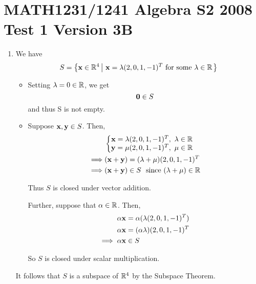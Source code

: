 \section*{MATH1231/1241 Algebra S2 2008 Test 1 Version 3B}
\begin{enumerate}
    \item We have
        $$S = \left\{ \mathbf{x} \in \mathbb{R}^4 \left|~ \mathbf{x} = \lambda (2, 0, 1, -1)^T
        \textrm{ for some } \lambda \in \mathbb{R} \right. \right\}$$

        \begin{itemize}
            \item
                Setting $\lambda = 0 \in \mathbb{R}$, we get
                $$\mathbf{0} \in S$$
                and thus S is not empty.

            \item
                Suppose $\mathbf{x}, \mathbf{y} \in S$. Then,
                \begin{align*}
                    &\left\{
                        \begin{matrix}
                            \mathbf{x} = \lambda (2, 0, 1, -1)^T, ~ \lambda \in \mathbb{R} \\
                            \mathbf{y} = \mu (2, 0, 1, -1)^T, ~ \mu \in \mathbb{R}
                        \end{matrix}
                    \right. \\
                    \implies&
                        (\mathbf{x}+\mathbf{y}) = (\lambda + \mu) (2, 0, 1, -1)^T \\
                    \implies&
                        (\mathbf{x}+\mathbf{y}) \in S ~ \textrm{ since } (\lambda+\mu) \in \mathbb{R}
                \end{align*}

                Thus $S$ is closed under vector addition.

                Further, suppose that $\alpha \in \mathbb{R}$. Then,
                \begin{align*}
                    \alpha \mathbf{x} &= \alpha (\lambda (2, 0, 1, -1)^T) \\
                    \alpha \mathbf{x} &= (\alpha \lambda) (2, 0, 1, -1)^T \\
                    \implies \alpha \mathbf{x} &\in S
                \end{align*}

                So $S$ is closed under scalar multiplication.
        \end{itemize}

        It follows that $S$ is a subspace of $\mathbb{R}^4$ by the Subspace Theorem.


\end{enumerate}
